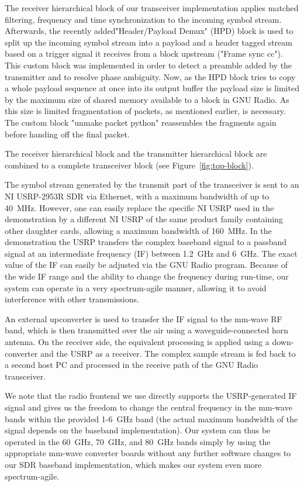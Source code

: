 \documentclass{sig-alternate}
\begin{document}
The receiver hierarchical block of our transceiver implementation applies matched filtering, frequency and time synchronization to the incoming symbol stream. Afterwards, the recently added\linebreak "Header/Payload Demux" (HPD) block is used to split up the incoming symbol stream into a payload and a header tagged stream based on a trigger signal it receives from a block upstream ("Frame sync cc"). This custom block was implemented in order to detect a preamble added by the transmitter and to resolve phase ambiguity. Now, as the HPD block tries to copy a whole payload sequence at once into its output buffer the payload size is limited by the maximum size of shared memory available to a block in GNU Radio. As this size is limited fragmentation of packets, as mentioned earlier, is necessary. The custom block "unmake packet python" reassembles the fragments again before handing off the final packet.

The receiver hierarchical block and the transmitter hierarchical block are combined to a complete transceiver block (see Figure~\ref{fig:top-block}).
 
 The symbol stream generated by the transmit part of the transceiver is sent to an NI USRP-2953R \cite{ettus} SDR via Ethernet, with a maximum bandwidth of up to 40~MHz. However, one can easily replace the specific NI USRP used in the demonstration by a different NI USRP of the same product family containing other daughter cards, allowing a maximum bandwidth of 160~MHz. In the demonstration the USRP transfers the complex baseband signal to a passband signal at an intermediate frequency (IF) between 1.2~GHz and 6~GHz. The exact value of the IF can easily be adjusted via the GNU Radio program. Because of the wide IF range and the ability to change the frequency during run-time, our system can operate in a very spectrum-agile manner, allowing it to avoid interference with other transmissions.

An external upconverter \cite{siversima} is used to transfer the IF signal to the mm-wave RF band, which is then transmitted over the air using a waveguide-connected horn antenna. On the receiver side, the equivalent  processing is applied using a down-converter and the USRP as a receiver. The complex sample stream is fed back to a second host PC and processed in the receive path of the GNU Radio transceiver.

We note that the radio frontend we use directly supports the USRP-generated IF signal and gives us the freedom to change the central frequency in the mm-wave bands within the provided 1-6~GHz band (the actual maximum bandwidth of the signal depends on the baseband implementation).  Our system can thus be operated in the 60~GHz, 70~GHz, and 80~GHz bands simply by using the appropriate mm-wave converter boards without any further software changes to our SDR baseband implementation, which makes our system even more spectrum-agile.
\end{document}
